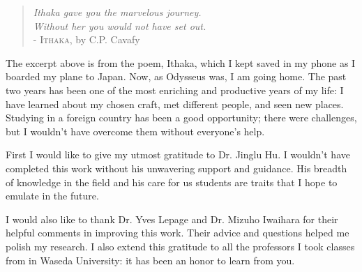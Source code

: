 %
%
%
%
%

\begin{quote}
{\itshape
Ithaka gave you the marvelous journey.\\
Without her you would not have set out.\\
}
- \textsc{Ithaka}, by C.P. Cavafy
\end{quote}

\par The excerpt above is from the poem, Ithaka, which I kept saved in my phone
as I boarded my plane to Japan. Now, as Odysseus was, I am going home.  The
past two years has been one of the most enriching and productive years of my
life: I have learned about my chosen craft, met different people, and seen new
places. Studying in a foreign country has been a good opportunity; there were
challenges, but I wouldn't have overcome them without everyone's help.

\par First I would like to give my utmost gratitude to Dr. Jinglu Hu. I
wouldn't have completed this work without his unwavering support and guidance.
His breadth of knowledge in the field and his care for us students are traits
that I hope to emulate in the future.

\par I would also like to thank Dr. Yves Lepage and Dr. Mizuho Iwaihara for
their helpful comments in improving this work. Their advice and questions
helped me polish my research. I also extend this gratitude to all the
professors I took classes from in Waseda University: it has been an honor to
learn from you.

